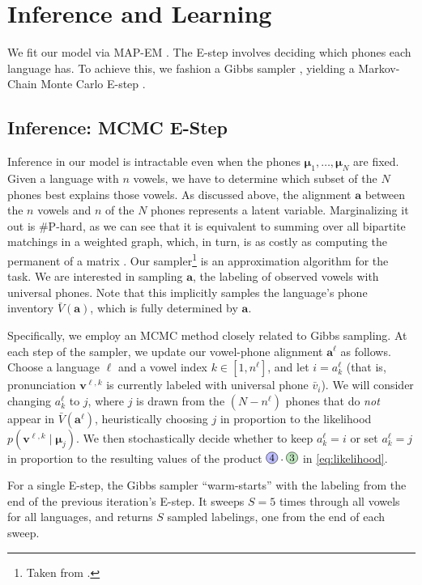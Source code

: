 \documentclass[11pt,a4paper]{article}
\newcommand*{\numberingBlueB}[1]{%
  \protect\tikz[baseline={([yshift=-1.5pt]n.base)}]%
  \protect\node[fill=blue!25,shape=circle,inner sep=1pt,draw](n){\small #1};}
\newcommand*{\numberingGreenB}[1]{%
  \protect\tikz[baseline={([yshift=-1.5pt]n.base)}]%
  \protect\node[fill=darkgreen!25,shape=circle,inner sep=1pt,draw](n){\small #1};}
\newcommand{\Vbar}{\bar{V}}
\newcommand{\vbar}{\bar{v}}
\renewcommand{\l}{^\ell}
\newcommand{\vmu}{{\boldsymbol \mu}}
\newcommand{\vv}{{\mathbf{v}}}
\newcommand{\va}{{\mathbf{a}}}
\begin{document}
\section{Inference and Learning}\label{sec:inference-learning}
We fit our model via MAP-EM \cite{dempster1977maximum}. The E-step involves deciding which phones each language has. To achieve this, we fashion a Gibbs sampler \cite{geman1984stochastic}, yielding a Markov-Chain
Monte Carlo E-step \cite{levine2001implementations}.

\subsection{Inference: MCMC E-Step}

Inference in our model is intractable even when the phones $\vmu_1, \ldots,
\vmu_N$ are fixed.  Given a language with $n$
vowels, we have to determine which subset of the $N$ phones
best explains those vowels. As discussed above, the alignment $\va$
between the $n$ vowels and $n$ of the $N$ phones represents a
latent variable. Marginalizing it out is \#P-hard, as we can see that it
is equivalent to summing over all bipartite matchings in a weighted
graph, which, in turn, is as costly as computing
the permanent of a matrix \cite{valiant1979complexity}. Our sampler\footnote{Taken from .}
is an approximation
algorithm for the task. We are interested in sampling
 $\va$, the labeling of observed vowels
with universal phones.  Note that this implicitly
samples the language's phone inventory $\Vbar(\va)$, which is fully determined by $\va$.

Specifically, we employ an MCMC method closely related to Gibbs sampling.  At each step of the sampler,
we update our vowel-phone alignment $\va\l$ as follows.  Choose a language $\ell$ and a vowel index
$k \in [1,n\l]$, and let $i = a\l_k$ (that is, pronunciation
$\vv^{\ell,k}$ is currently labeled with universal phone $\vbar_i$).
We will consider changing $a\l_k$ to $j$, where $j$ is drawn
from the $(N - n\l)$ phones that do {\em not} appear in
$\Vbar(\va\l)$, heuristically
choosing $j$ in proportion to the likelihood $p(\vv^{\ell,k} \mid
\vmu_{j})$. 
We then stochastically decide whether to keep $a\l_k = i$ or set $a\l_k = j$ in
proportion to the resulting values of the product $\text{\numberingBlueB{4}}\cdot\text{\numberingGreenB{3}}$ in
\cref{eq:likelihood}.

For a single E-step, the Gibbs sampler ``warm-starts'' with the labeling from the end of the previous iteration's E-step.  It sweeps $S=5$ times through all vowels for all languages, and returns $S$ sampled labelings, one from the end of each sweep.
\end{document}
